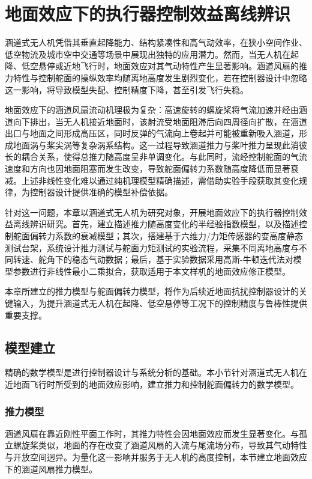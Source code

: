 \chapter{地面效应下的执行器控制效益离线辨识}
涵道式无人机凭借其垂直起降能力、结构紧凑性和高气动效率，在狭小空间作业、低空物流及城市空中交通等场景中展现出独特的应用潜力。然而，当无人机在起降、低空悬停或近地飞行时，地面效应对其气动特性产生显著影响。涵道风扇的推力特性与控制舵面的操纵效率均随离地高度发生剧烈变化，若在控制器设计中忽略这一影响，将导致模型失配、控制精度下降，甚至引发飞行失稳。

地面效应下的涵道风扇流动机理极为复杂：高速旋转的螺旋桨将气流加速并经由涵道向下排出，当无人机接近地面时，该射流受地面阻滞后向四周径向扩散，在涵道出口与地面之间形成高压区，同时反弹的气流向上卷起并可能被重新吸入涵道，形成地面涡与桨尖涡等复杂涡系结构。这一过程导致涵道推力与桨叶推力呈现此消彼长的耦合关系，使得总推力随高度呈非单调变化。与此同时，流经控制舵面的气流速度和方向也因地面阻塞而发生改变，导致舵面偏转力系数随高度降低而显著衰减。上述非线性变化难以通过纯机理模型精确描述，需借助实验手段获取其变化规律，为控制器设计提供准确的模型补偿依据。

针对这一问题，本章以涵道式无人机为研究对象，开展地面效应下的执行器控制效益离线辨识研究。首先，建立描述推力随高度变化的半经验指数模型，以及描述控制舵面偏转力系数的衰减模型；其次，搭建基于六维力/力矩传感器的变高度静态测试台架，系统设计推力测试与舵面力矩测试的实验流程，采集不同离地高度与不同转速、舵角下的稳态气动数据；最后，基于实验数据采用高斯-牛顿迭代法对模型参数进行非线性最小二乘拟合，获取适用于本文样机的地面效应修正模型。

本章所建立的推力模型与舵面偏转力模型，将作为后续近地面抗扰控制器设计的关键输入，为提升涵道式无人机在起降、低空悬停等工况下的控制精度与鲁棒性提供重要支撑。

\section{模型建立} %
\label{sec:model_identification}
精确的数学模型是进行控制器设计与系统分析的基础。本小节针对涵道式无人机在近地面飞行时所受到的地面效应影响，建立推力和控制舵面偏转力的数学模型。

\subsection{推力模型}
\label{subsec:thrust_model}

涵道风扇在靠近刚性平面工作时，其推力特性会因地面效应而发生显著变化。与孤立螺旋桨类似，地面的存在改变了涵道风扇的入流与尾流场分布，导致其气动特性与开放空间迥异\cite{matuz2021ground}。为量化这一影响并服务于无人机的高度控制，本节建立地面效应下的涵道风扇推力模型。


